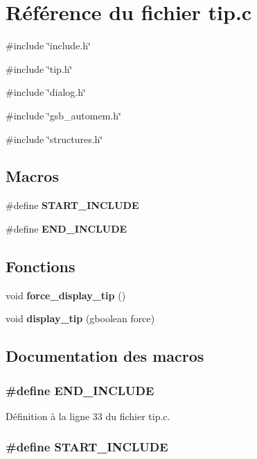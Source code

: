 \section{Référence du fichier tip.c}
\label{tip_8c}
{\ttfamily \#include \char`\"{}include.h\char`\"{}}\par
{\ttfamily \#include \char`\"{}tip.h\char`\"{}}\par
{\ttfamily \#include \char`\"{}dialog.h\char`\"{}}\par
{\ttfamily \#include \char`\"{}gsb\_\-automem.h\char`\"{}}\par
{\ttfamily \#include \char`\"{}structures.h\char`\"{}}\par
\subsection*{Macros}
\begin{DoxyCompactItemize}
\item 
\#define {\bf START\_\-INCLUDE}
\item 
\#define {\bf END\_\-INCLUDE}
\end{DoxyCompactItemize}
\subsection*{Fonctions}
\begin{DoxyCompactItemize}
\item 
void {\bf force\_\-display\_\-tip} ()
\item 
void {\bf display\_\-tip} (gboolean force)
\end{DoxyCompactItemize}


\subsection{Documentation des macros}
\subsubsection[{END\_\-INCLUDE}]{\setlength{\rightskip}{0pt plus 5cm}\#define END\_\-INCLUDE}\label{tip_8c_a55a18c280f8affeab9b62b641f867ad7}


Définition à la ligne 33 du fichier tip.c.

\subsubsection[{START\_\-INCLUDE}]{\setlength{\rightskip}{0pt plus 5cm}\#define START\_\-INCLUDE}\label{tip_8c_a40830a222d697bac493b539cef45f084}


